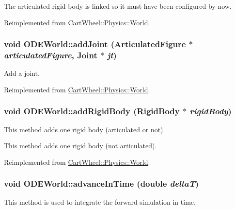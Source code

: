 The articulated rigid body is linked so it must have been configured by now. 

Reimplemented from \hyperlink{classCartWheel_1_1Physics_1_1World_a3804e4088fe10df5c4c08fde98bcbadc}{CartWheel::Physics::World}.

\hypertarget{classCartWheel_1_1Physics_1_1ODEWorld_afb5156756a0a15cc5e535f1ba405324a}{
\subsubsection[{addJoint}]{\setlength{\rightskip}{0pt plus 5cm}void ODEWorld::addJoint ({\bf ArticulatedFigure} $\ast$ {\em articulatedFigure}, \/  {\bf Joint} $\ast$ {\em jt})}}
\label{classCartWheel_1_1Physics_1_1ODEWorld_afb5156756a0a15cc5e535f1ba405324a}
Add a joint. 

Reimplemented from \hyperlink{classCartWheel_1_1Physics_1_1World_a4e4033d358b1654796aa3c3463fa875a}{CartWheel::Physics::World}.

\hypertarget{classCartWheel_1_1Physics_1_1ODEWorld_a908e6c943e0f464135695aa4942c93d7}{
\subsubsection[{addRigidBody}]{\setlength{\rightskip}{0pt plus 5cm}void ODEWorld::addRigidBody ({\bf RigidBody} $\ast$ {\em rigidBody})}}
\label{classCartWheel_1_1Physics_1_1ODEWorld_a908e6c943e0f464135695aa4942c93d7}
This method adds one rigid body (articulated or not).

This method adds one rigid body (not articulated). 

Reimplemented from \hyperlink{classCartWheel_1_1Physics_1_1World_a1ca9b7e988c6f36f136cce897d0f49d8}{CartWheel::Physics::World}.

\hypertarget{classCartWheel_1_1Physics_1_1ODEWorld_af4478f856562a7412583a788f22a7422}{
\subsubsection[{advanceInTime}]{\setlength{\rightskip}{0pt plus 5cm}void ODEWorld::advanceInTime (double {\em deltaT})}}
\label{classCartWheel_1_1Physics_1_1ODEWorld_af4478f856562a7412583a788f22a7422}
This method is used to integrate the forward simulation in time. 

